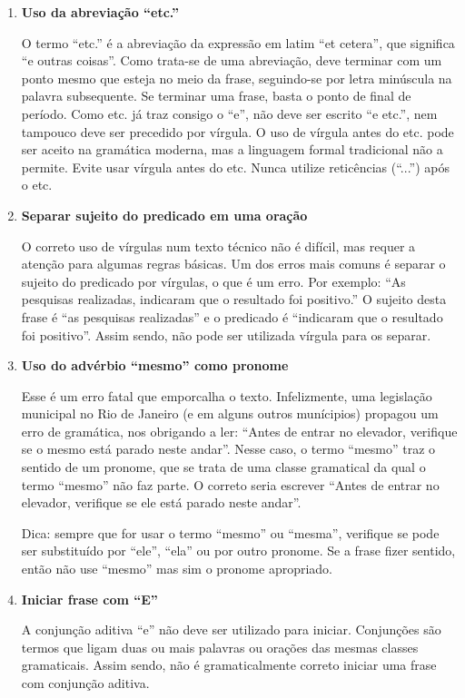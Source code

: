 \begin{enumerate}[label=\alph*)]
\item {\bfseries Uso da abreviação “etc.”}

O termo “etc.” é a abreviação da expressão em latim “et cetera”, que significa “e outras coisas”. Como trata-se de uma abreviação, deve terminar com um ponto mesmo que esteja no meio da frase, seguindo-se por letra minúscula na palavra subsequente. Se terminar uma frase, basta o ponto de final de período. Como etc. já traz consigo o “e”, não deve ser escrito “e etc.”, nem tampouco deve ser precedido por vírgula. O uso de vírgula antes do etc. pode ser aceito na gramática moderna, mas a linguagem formal tradicional não a permite. Evite usar vírgula antes do etc. Nunca utilize reticências (“...”) após o etc.

\item {\bfseries Separar sujeito do predicado em uma oração}

O correto uso de vírgulas num texto técnico não é difícil, mas requer a atenção para algumas regras básicas. Um dos erros mais comuns é separar o sujeito do predicado por vírgulas, o que é um erro. Por exemplo:
“As pesquisas realizadas, indicaram que o resultado foi positivo.”
O sujeito desta frase é “as pesquisas realizadas” e o predicado é “indicaram que o resultado foi positivo”. Assim sendo, não pode ser utilizada vírgula para os separar.

\item {\bfseries Uso do advérbio “mesmo” como pronome}

Esse é um erro fatal que emporcalha o texto. Infelizmente, uma legislação municipal no Rio de Janeiro (e em alguns outros munícipios) propagou um erro de gramática, nos obrigando a ler: “Antes de entrar no elevador, verifique se o mesmo está parado neste andar”. Nesse caso, o termo “mesmo” traz o sentido de um pronome, que se trata de uma classe gramatical da qual o termo “mesmo” não faz parte. O correto seria escrever “Antes de entrar no elevador, verifique se ele está parado neste andar”.

Dica: sempre que for usar o termo “mesmo” ou “mesma”, verifique se pode ser substituído por “ele”, “ela” ou por outro pronome. Se a frase fizer sentido, então não use “mesmo” mas sim o pronome apropriado.
\item {\bfseries Iniciar frase com “E”}

A conjunção aditiva “e” não deve ser utilizado para iniciar. Conjunções são termos que ligam duas ou mais palavras ou orações das mesmas classes gramaticais. Assim sendo, não é gramaticalmente correto iniciar uma frase com conjunção aditiva.


\end{enumerate}
